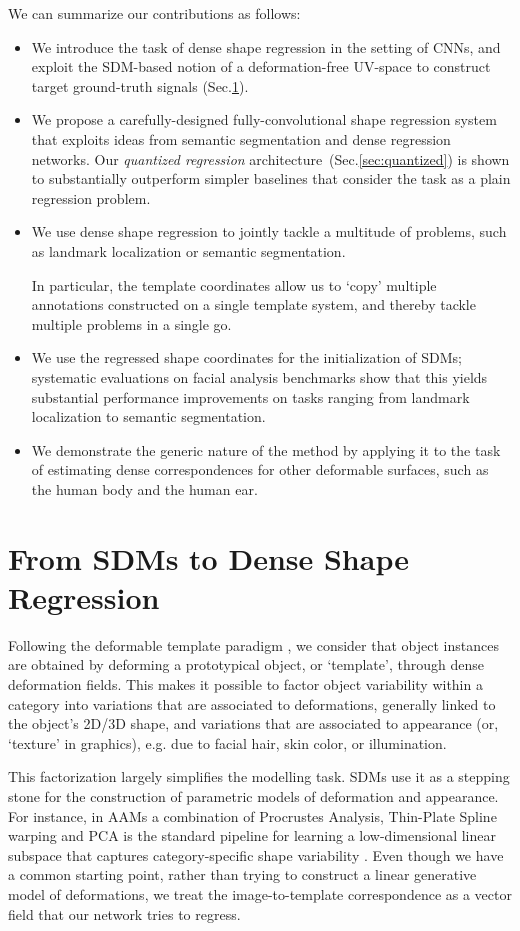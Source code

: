 \documentclass[10pt,twocolumn,letterpaper]{article}
\begin{document}
We can summarize our contributions as follows:
\begin{itemize}
\item We introduce the task of dense shape regression in the setting of CNNs, and exploit the SDM-based notion of a deformation-free UV-space to construct target ground-truth signals (Sec.\ref{sec:SDMs}).
\item We propose a carefully-designed fully-convolutional shape regression system that exploits ideas from semantic segmentation and dense regression networks. Our \textit{quantized regression} architecture~(Sec.\ref{sec:quantized}) is shown to substantially outperform simpler baselines that consider the task as a plain regression problem. 
\item We use dense shape regression to jointly tackle a multitude of problems, such as landmark localization or semantic segmentation.

In particular, the template coordinates allow us to `copy' multiple annotations constructed on a single template system, and thereby tackle multiple problems in a single go.
\item We use the regressed shape coordinates for the initialization of SDMs; systematic evaluations on facial analysis benchmarks show that this yields substantial performance improvements  on tasks ranging from landmark localization to semantic segmentation.
\item We  demonstrate the generic nature of the method by applying it to the task of estimating dense correspondences for other deformable surfaces, such as the human body and the human ear. 
\end{itemize}
\section{From SDMs to Dense Shape Regression}\label{sec:SDMs}Following the deformable template paradigm \cite{yuille1991deformable,Grenander1991}, we consider that object instances are obtained by deforming a prototypical object, or `template', through  dense deformation fields. 
This makes it possible  to factor  object variability within a category into variations that are associated to  deformations, generally linked to the object's 2D/3D shape, and variations that are associated to appearance (or, `texture' in graphics), e.g. due to facial hair, skin color, or illumination. 

This factorization largely simplifies the  modelling task. SDMs use it as a stepping stone for the construction of parametric models of deformation and appearance. For instance, in AAMs a combination of Procrustes Analysis, Thin-Plate Spline warping and PCA is the standard pipeline for learning a low-dimensional linear subspace that captures category-specific shape variability \cite{cootes2001active}. Even though we have a common starting point, rather than trying to construct a linear generative model of deformations, we treat the image-to-template correspondence as a vector field that our network tries to regress.
\end{document}
